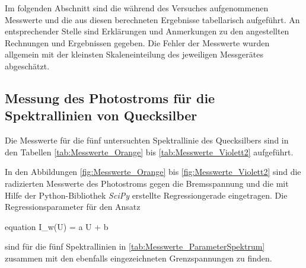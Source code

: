 Im folgenden Abschnitt sind die während des Versuches aufgenommenen Messwerte und die 
aus diesen berechneten Ergebnisse tabellarisch aufgeführt. An entsprechender Stelle
sind Erklärungen und Anmerkungen zu den angestellten Rechnungen und Ergebnissen gegeben.
Die Fehler der Messwerte wurden allgemein mit der kleinsten Skaleneinteilung des jeweiligen 
Messgerätes abgeschätzt.


\subsection{Messung des Photostroms für die Spektrallinien von Quecksilber}

		
		Die Messwerte für die fünf untersuchten Spektrallinie des Quecksilbers sind
		in den Tabellen \ref{tab:Messwerte_Orange} bis \ref{tab:Messwerte_Violett2} aufgeführt.
		
		
		
		
		
		
		
		In den Abbildungen \ref{fig:Messwerte_Orange} bis \ref{fig:Messwerte_Violett2} sind die 
		radizierten Messwerte des Photostroms gegen die Bremsspannung und die 
		mit Hilfe der Python-Bibliothek \emph{SciPy} \cite{SciPy} erstellte Regressiongerade 
		eingetragen. 
		Die Regressionsparameter für den Ansatz
		\begin{empheq}{equation}
			I_{w}(U) = a \cdot U + b
		\end{empheq}
		sind für die fünf Spektrallinien in \cref{tab:Messwerte_ParameterSpektrum} zusammen mit  
		den ebenfalls eingezeichneten Grenzspannungen zu finden.
		
		
		

